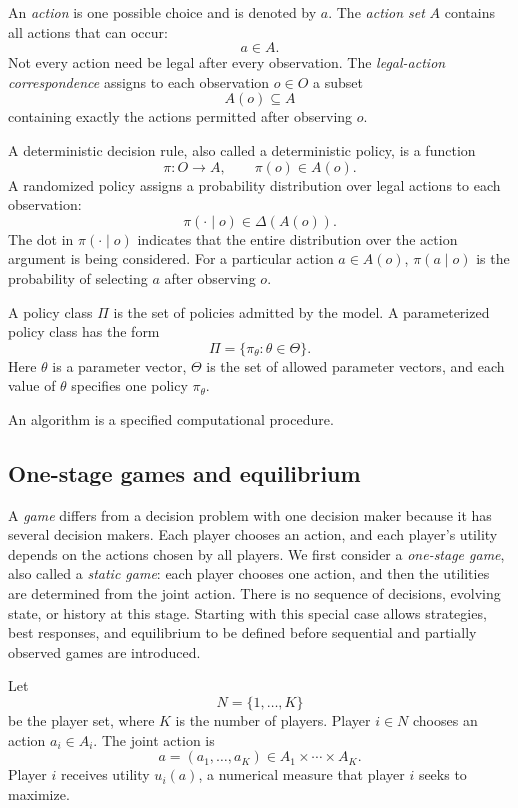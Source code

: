 An \emph{action} is one possible choice and is denoted by $a$. The \emph{action set} $A$ contains all actions that can occur:
\[
    a\in A.
\]
Not every action need be legal after every observation. The \emph{legal-action correspondence} assigns to each observation $o\in O$ a subset
\[
    A(o)\subseteq A
\]
containing exactly the actions permitted after observing $o$.

A deterministic decision rule, also called a deterministic policy, is a function
\[
    \pi:O\to A,
    \qquad
    \pi(o)\in A(o).
\]
A randomized policy assigns a probability distribution over legal actions to each observation:
\[
    \pi(\cdot\mid o)\in\Delta(A(o)).
\]
The dot in \(\pi(\cdot\mid o)\) indicates that the entire distribution over the action argument is being considered. For a particular action $a\in A(o)$, \(\pi(a\mid o)\) is the probability of selecting $a$ after observing $o$.

A policy class $\Pi$ is the set of policies admitted by the model. A parameterized policy class has the form
\[
    \Pi=\{\pi_\theta:\theta\in\Theta\}.
\]
Here $\theta$ is a parameter vector, $\Theta$ is the set of allowed parameter vectors, and each value of $\theta$ specifies one policy $\pi_\theta$.

An algorithm is a specified computational procedure.


\subsection{One-stage games and equilibrium}
\label{app:one-stage-equilibrium}

A \emph{game} differs from a decision problem with one decision maker because it has several decision makers. Each player chooses an action, and each player's utility depends on the actions chosen by all players. We first consider a \emph{one-stage game}, also called a \emph{static game}: each player chooses one action, and then the utilities are determined from the joint action. There is no sequence of decisions, evolving state, or history at this stage. Starting with this special case allows strategies, best responses, and equilibrium to be defined before sequential and partially observed games are introduced.

Let
\[
    N=\{1,\ldots,K\}
\]
be the player set, where $K$ is the number of players. Player $i\in N$ chooses an action $a_i\in A_i$. The joint action is
\[
    a=(a_1,\ldots,a_K)
    \in A_1\times\cdots\times A_K.
\]
Player $i$ receives utility $u_i(a)$, a numerical measure that player $i$ seeks to maximize.

